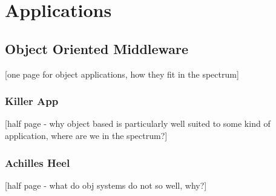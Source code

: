\documentclass{acm_proc_article-sp}
\begin{document}
% 
% 
% 
% 
% 
% 
% 
% 



\section{Applications}

\subsection{Object Oriented Middleware}

[one page for object applications, how they fit in the spectrum]


\subsubsection{Killer App}

[half page - why object based is particularly well suited to some kind of application, where are we in the spectrum?]


\subsubsection{Achilles Heel}

[half page - what do obj systems do not so well, why?]


\end{document}
